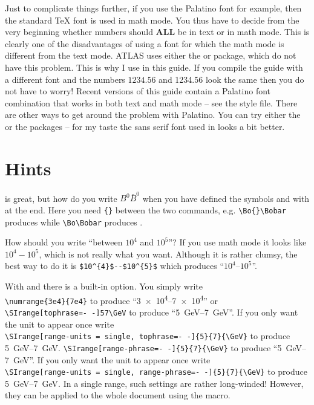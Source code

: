 Just to complicate things further, if you use the Palatino font for
example, then the standard \TeX{} font is used in math mode. You thus
have to decide from the very beginning whether numbers should
\textbf{ALL} be in text or in math mode. This is clearly one of the
disadvantages of using a font for which the math mode is different
from the text mode. ATLAS uses either the  or  package,
which do not have this problem. 
This is why I use  in this guide. 
If you compile the guide
with a different font and the numbers $1234.56$ and 1234.56 look the
same then you do not have to worry! 
Recent versions of this guide contain a Palatino font combination that works in both
text and math mode -- see the style file.
There are other ways to get around the problem with Palatino. 
You can try either the  or the
 packages -- for my taste the sans serif font used
in  looks a bit better.


\section{Hints}
\label{sec:tips:hints}

 is great, but how do you write $B^{0}\bar{B}^{0}$ when
you have defined the symbols  and  with
 at the end. Here you need \verb+{}+ between the two
commands, e.g. \verb+\Bo{}\Bobar+ produces \Bo{}\Bobar while
\verb+\Bo\Bobar+ produces \Bo\Bobar.

How should you write \enquote{between $10^{4}$ and $10^{5}$}?
If you use math mode it looks like $10^{4} - 10^{5}$, which is not
really what you want. Although it is rather clumsy, the best way to do
it is \verb+$10^{4}$--$10^{5}$+ which produces
\enquote{$10^{4}$--$10^{5}$}.

With  and  there
is a built-in option. You simply write\\
\verb+\numrange{3e4}{7e4}+
to produce \enquote{\numrange{3e4}{7e4}} or\\
 {%
  \texttt{\textbackslash SIrange[tophrase=-\,-]{5}{7}{\textbackslash GeV}}
  to produce \enquote{\SIrange[tophrase=--]{5}{7}{\GeV}}.
  If you only want the unit to appear once write\\
  \texttt{\textbackslash SIrange[range-units = single, tophrase=-\,-]\{5\}\{7\}\{\textbackslash GeV\}}
  to produce
  \SIrange[trapambigrange=false, tophrase=--]{5}{7}{\GeV}.
}{%
  \texttt{\textbackslash SIrange[range-phrase=-\,-]\{5\}\{7\}\{\textbackslash GeV\}}
  to produce \enquote{\SIrange[range-phrase=--]{5}{7}{\GeV}}.
  If you only want the unit to appear once write\\
  \texttt{\textbackslash SIrange[range-units = single, range-phrase=-\,-]\{5\}\{7\}\{\textbackslash GeV\}}
  to produce
  \SIrange[range-units = single, range-phrase=--]{5}{7}{\GeV}.
}
In a single range, such settings are rather long-winded!
However, they can be applied to the whole
document using the  macro.

